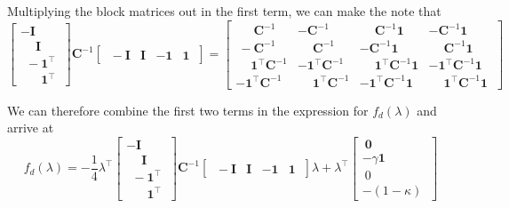 \documentclass{article}
\numberwithin{equation}{section}
\begin{document}
Multiplying the block matrices out in the first term, we can make the note that
\begin{equation*}
    \begin{bmatrix}
        -\mathbf{I} \ \\ \phantom{-} \mathbf{I} \ \\ \ \ -\mathbf{1}^\top \ \\
        \ \ \phantom{-} \mathbf{1}^\top \
    \end{bmatrix}\mathbf{C}^{-1}\begin{bmatrix}
        \ -\mathbf{I} & \mathbf{I} & -\mathbf{1} & \mathbf{1} \
    \end{bmatrix} = \begin{bmatrix}
        \ \phantom{-}\mathbf{C}^{-1} & -\mathbf{C}^{-1} &
        \phantom{-}\mathbf{C}^{-1}\mathbf{1} & -\mathbf{C}^{-1}\mathbf{1} \ \\
        \ -\mathbf{C}^{-1} & \phantom{-}\mathbf{C}^{-1} & 
        -\mathbf{C}^{-1}\mathbf{1} & \phantom{-}\mathbf{C}^{-1}\mathbf{1} \ \\
        \phantom{-}\mathbf{1}^\top\mathbf{C}^{-1} &
        -\mathbf{1}^\top\mathbf{C}^{-1} &
        \phantom{-}\mathbf{1}^\top\mathbf{C}^{-1}\mathbf{1} &
        -\mathbf{1}^\top\mathbf{C}^{-1}\mathbf{1} \ \\
        -\mathbf{1}^\top\mathbf{C}^{-1} &
        \phantom{-}\mathbf{1}^\top\mathbf{C}^{-1} &
        -\mathbf{1}^\top\mathbf{C}^{-1}\mathbf{1} &
        \phantom{-}\mathbf{1}^\top\mathbf{C}^{-1}\mathbf{1} \
    \end{bmatrix}
\end{equation*}

We can therefore combine the first two terms in the expression for
$ f_d(\lambda) $ and arrive at
\begin{equation*}
    f_d(\lambda) = -\frac{1}{4}\lambda^\top\begin{bmatrix}
        -\mathbf{I} \ \\ \phantom{-} \mathbf{I} \ \\ \ \ -\mathbf{1}^\top \ \\
        \ \ \phantom{-} \mathbf{1}^\top \
    \end{bmatrix}\mathbf{C}^{-1}\begin{bmatrix}
        \ -\mathbf{I} & \mathbf{I} & -\mathbf{1} & \mathbf{1} \
    \end{bmatrix}\lambda + \lambda^\top\begin{bmatrix}
        \ \mathbf{0} \ \\ -\gamma\mathbf{1} \ \\ \ 0 \ \\ -(1 - \kappa) \
    \end{bmatrix}
\end{equation*}
\end{document}
